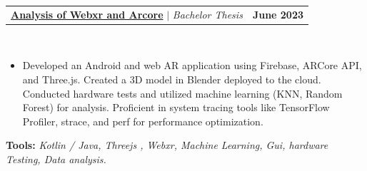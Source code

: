\documentclass[letterpaper,11pt]{article}
\makeatletter
\newcommand{\resumeItem}[1]{
  \item\small{
    {#1 \vspace{-2pt}}
  }
}
\newcommand{\resumeProjectHeading}[2]{
    \item
    \begin{tabular*}{1.001\textwidth}{l@{\extracolsep{\fill}}r}
      \small#1 & \textbf{\small #2}\\
    \end{tabular*}\vspace{-7pt}
}
\newcommand{\resumeItemListStart}{\begin{itemize}}
\newcommand{\resumeItemListEnd}{\end{itemize}\vspace{-5pt}}
\makeatother
\begin{document}
            

                

 \resumeProjectHeading
          {\textbf{\href{https://www.yakkshit.com/#project-1}{Analysis of Webxr and Arcore}} $|$ \emph{Bachelor Thesis \faGithub}}{June 2023}\\
          \vspace{9pt}
          \vspace{-8pt}
          \resumeItemListStart
            \resumeItem{Developed an Android and web AR application using Firebase, ARCore API, and Three.js. Created a 3D model in Blender deployed to the cloud. Conducted hardware tests and utilized machine learning (KNN, Random Forest) for analysis. Proficient in system tracing tools like TensorFlow Profiler, strace, and perf for performance optimization.}
          \resumeItemListEnd 
          \textbf{Tools:}\emph{
                                Kotlin / Java, Threejs , Webxr, Machine Learning, Gui, hardware Testing, Data analysis.}

 
                

\end{document}
